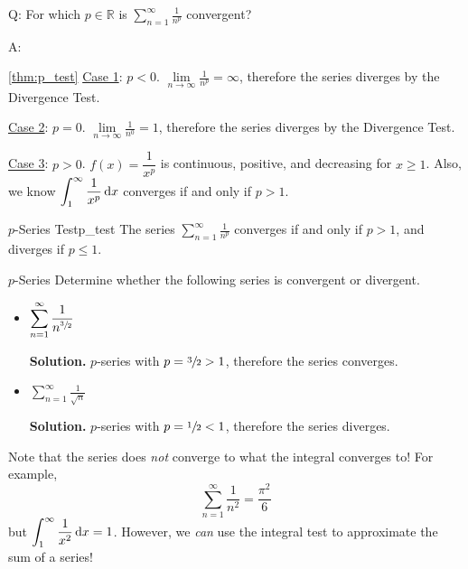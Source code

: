 Q\@: For which $ p\in\mathbb{R} $ is $ \displaystyle \sum\limits_{n=1}^{\infty} \frac{1}{n^p} $
convergent?

A\@:
\begin{Proof}{\ref{thm:p_test}}{}
    \underline{Case 1}: $ p<0 $. $ \displaystyle \lim\limits_{{n} \to {\infty}} \frac{1}{n^p} =\infty $,
    therefore the series diverges by the Divergence Test.

    \underline{Case 2}: $ p=0 $. $ \displaystyle \lim\limits_{{n} \to {\infty}} \frac{1}{n^0} =1 $,
    therefore the series diverges by the Divergence Test.

    \underline{Case 3}: $ p>0 $. $ f(x)=\dfrac{1}{x^p} $ is continuous, positive, and decreasing
    for $ x\geqslant 1 $. Also, we know $ \displaystyle \int_{1}^{\infty} \frac{1}{x^p} \odif{x} $
    converges if and only if $ p>1 $.
\end{Proof}

\begin{Theorem}{$ p $-Series Test}{p_test}
    The series $ \displaystyle \sum\limits_{n=1}^{\infty} \frac{1}{n^p}  $ converges
    if and only if $ p>1 $, and diverges if $ p\leqslant 1 $.
\end{Theorem}

\begin{Example}{$ p $-Series}{}
    Determine whether the following series is convergent or divergent.
    \begin{itemize}
        \item $ \displaystyle \sum\limits_{n=1}^{\infty} \frac{1}{n^{\sfrac{3}{2} }} $

              \textbf{Solution.} $ p $-series with $ p=\sfrac{3}{2} >1 $,
              therefore the series converges.
        \item $ \displaystyle \sum\limits_{n=1}^{\infty} \frac{1}{\sqrt{n}} $

              \textbf{Solution.} $ p $-series with $ p=\sfrac{1}{2} <1 $, therefore the series
              diverges.
    \end{itemize}
\end{Example}

\begin{Remark}{}{}
    Note that the series does \emph{not} converge to what the integral converges to! For example,
    \[ \sum\limits_{n=1}^{\infty} \frac{1}{n^2} =\frac{\pi^2}{6} \]
    but $ \displaystyle \int_{1}^{\infty} \frac{1}{x^2} \odif{x}=1$.
    However, we \emph{can} use the integral
    test to approximate the sum of a series!
\end{Remark}

